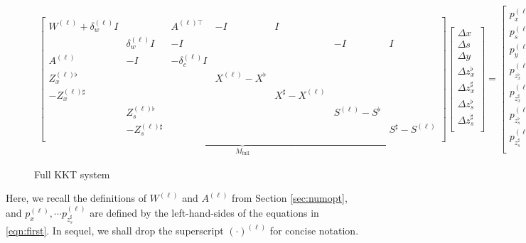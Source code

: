 \begin{figure}[t]
  \begin{align*}
    \underbrace{
    \begin{bmatrix}
      W^{(\ell)}  + \delta^{(\ell)}_w I & & A^{(\ell)\top}& -I & I &  \\
      & \delta^{(\ell)}_w I & -I&&&-I & I\\
      A^{(\ell)}& -I & -\delta^{(\ell)}_c I\\
      Z_x^{(\ell)\flat}&&&X^{(\ell)}-X^\flat\\
      -Z_x^{(\ell)\sharp}&&&&X^\sharp-X^{(\ell)}\\
      &Z_s^{(\ell)\flat}&&&&S^{(\ell)}-S^\flat\\
      &-Z_s^{(\ell)\sharp}&&&&&S^\sharp-S^{(\ell)}\\
    \end{bmatrix}
    }_{M_\text{full}}
    \begin{bmatrix}
      \Delta x \\
      \Delta s \\
      \Delta y \\
      \Delta z_x^\flat \\
      \Delta z_x^\sharp \\
      \Delta z_s^\flat \\
      \Delta z_s^\sharp \\
    \end{bmatrix} =
    \begin{bmatrix}
      p^{(\ell)}_{x }\\
      p^{(\ell)}_{s }\\
      p^{(\ell)}_{y }\\
      p^{(\ell)}_{z_x^\flat }\\
      p^{(\ell)}_{z_x^\sharp }\\
      p^{(\ell)}_{z_s^\flat }\\
      p^{(\ell)}_{z_s^\sharp }\\
    \end{bmatrix}
  \end{align*}
  \caption{Full KKT system}\label{fig:very-long-eqn} 
\end{figure}
Here, we recall the definitions of $W^{(\ell)}$ and $A^{(\ell)}$ from Section \ref{sec:numopt}, and
$p^{(\ell)}_x,\cdots p^{(\ell)}_{z_s^\sharp}$ are defined by the left-hand-sides of the equations in
\eqref{eqn:first}. In sequel, we shall drop the superscript
$(\cdot)^{(\ell)}$ for concise notation.

